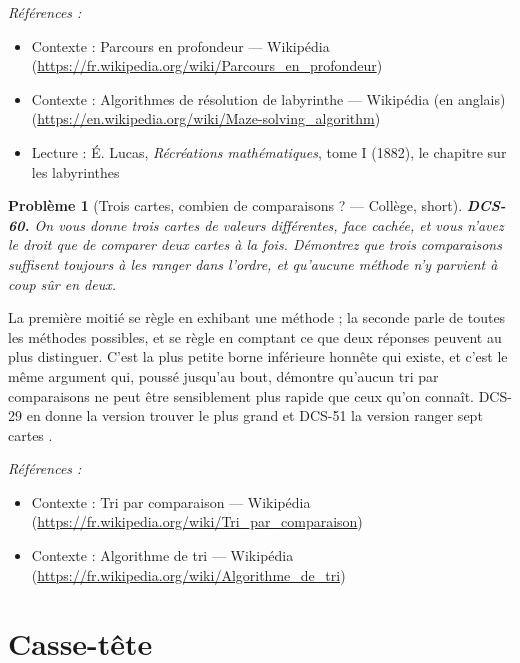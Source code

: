 \documentclass[11pt]{article}
\newtheorem{problem}{Problème}
\newenvironment{refs}{\par\small\noindent\emph{Références :}\begin{itemize}\setlength\itemsep{0pt}}{\end{itemize}\normalsize}
\begin{document}
\begin{refs}
\item Contexte : Parcours en profondeur --- Wikipédia (\url{https://fr.wikipedia.org/wiki/Parcours_en_profondeur})
\item Contexte : Algorithmes de résolution de labyrinthe --- Wikipédia (en anglais) (\url{https://en.wikipedia.org/wiki/Maze-solving_algorithm})
\item Lecture : É. Lucas, \textit{Récréations mathématiques}, tome I (1882), le chapitre sur les labyrinthes
\end{refs}

\bigskip

\begin{problem}[{Trois cartes, combien de comparaisons ? --- Collège, short}]
\textbf{DCS-60.} On vous donne trois cartes de valeurs différentes, face
cachée, et vous n'avez le droit que de comparer deux cartes à la fois. Démontrez que trois
comparaisons suffisent toujours à les ranger dans l'ordre, et qu'aucune méthode n'y parvient
à coup sûr en deux.
\end{problem}

\noindent La première moitié se règle en exhibant une méthode ; la seconde parle de
toutes les méthodes possibles, et se règle en comptant ce que deux réponses peuvent au plus
distinguer. C'est la plus petite borne inférieure honnête qui existe, et c'est le même
argument qui, poussé jusqu'au bout, démontre qu'aucun tri par comparaisons ne peut être
sensiblement plus rapide que ceux qu'on connaît. DCS-29 en donne la version \og{} trouver le plus
grand \fg{} et DCS-51 la version \og{} ranger sept cartes \fg{}.

\begin{refs}
\item Contexte : Tri par comparaison --- Wikipédia (\url{https://fr.wikipedia.org/wiki/Tri_par_comparaison})
\item Contexte : Algorithme de tri --- Wikipédia (\url{https://fr.wikipedia.org/wiki/Algorithme_de_tri})
\end{refs}

\bigskip


\section*{Casse-tête}
\end{document}
